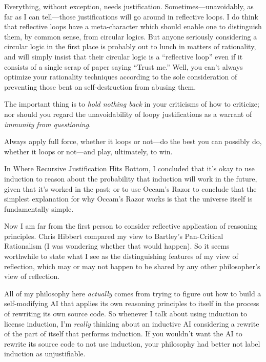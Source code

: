 {
 Everything, without exception, needs justification.
Sometimes---unavoidably, as far as I can tell---those justifications
will go around in reflective loops. I do think that reflective loops
have a meta-character which should enable one to distinguish them, by
common sense, from circular logics. But anyone seriously considering a
circular logic in the first place is probably out to lunch in matters
of rationality, and will simply insist that their circular logic is a
``reflective loop'' even if it
consists of a single scrap of paper saying ``Trust
me.'' Well, you can't always optimize
your rationality techniques according to the sole consideration of
preventing those bent on self-destruction from abusing them.}

{
 The important thing is to \textit{hold nothing back} in your
criticisms of how to criticize; nor should you regard the
unavoidability of loopy justifications as a warrant of \textit{immunity
from questioning}.}

{
 Always apply full force, whether it loops or not---do the best you
can possibly do, whether it loops or not---and play, ultimately, to
win.}

\myendsectiontext


{
 In Where Recursive Justification Hits Bottom, I concluded that
it's okay to use induction to reason about the
probability that induction will work in the future, given that
it's worked in the past; or to use
Occam's Razor to conclude that the simplest explanation
for why Occam's Razor works is that the universe itself
is fundamentally simple. }

{
 Now I am far from the first person to consider reflective
application of reasoning principles. Chris Hibbert compared my view to
Bartley's Pan-Critical Rationalism (I was wondering
whether that would happen). So it seems worthwhile to state what I see
as the distinguishing features of my view of reflection, which may or
may not happen to be shared by any other philosopher's
view of reflection.}

{
 All of my philosophy here \textit{actually} comes from trying to
figure out how to build a self-modifying AI that applies its own
reasoning principles to itself in the process of rewriting its own
source code. So whenever I talk about using induction to license
induction, I'm \textit{really} thinking about an
inductive AI considering a rewrite of the part of itself that performs
induction. If you wouldn't want the AI to rewrite its
source code to not use induction, your philosophy had better not label
induction as unjustifiable.}

